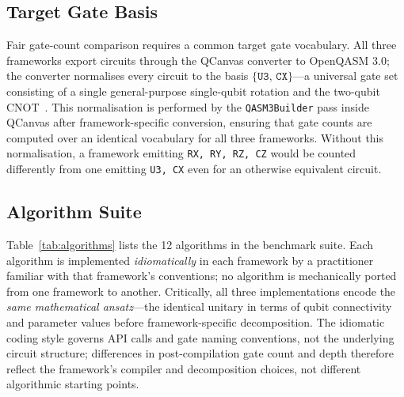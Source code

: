 \subsection{Target Gate Basis}

Fair gate-count comparison requires a common target gate vocabulary.
All three frameworks export circuits through the QCanvas converter to
OpenQASM 3.0; the converter normalises every circuit to the basis
$\{\texttt{U3},\,\texttt{CX}\}$---a universal gate set consisting of a
single general-purpose single-qubit rotation and the two-qubit
CNOT~\cite{nielsen2010quantum}.
This normalisation is performed by the \texttt{QASM3Builder} pass inside
QCanvas after framework-specific conversion, ensuring that gate counts
are computed over an identical vocabulary for all three frameworks.
Without this normalisation, a framework emitting \texttt{RX, RY, RZ, CZ}
would be counted differently from one emitting \texttt{U3, CX} even for
an otherwise equivalent circuit.

\subsection{Algorithm Suite}

Table~\ref{tab:algorithms} lists the 12 algorithms in the benchmark
suite.
Each algorithm is implemented \emph{idiomatically} in each framework by
a practitioner familiar with that framework's conventions; no algorithm
is mechanically ported from one framework to another.
Critically, all three implementations encode the \emph{same mathematical
ansatz}---the identical unitary in terms of qubit connectivity and
parameter values before framework-specific decomposition.
The idiomatic coding style governs API calls and gate naming conventions,
not the underlying circuit structure; differences in post-compilation
gate count and depth therefore reflect the framework's compiler and
decomposition choices, not different algorithmic starting points.

